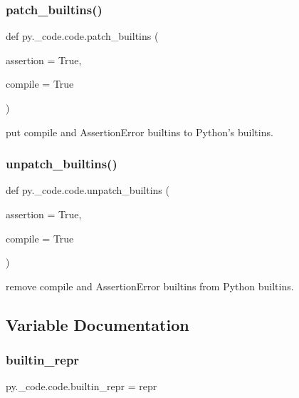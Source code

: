 \subsubsection{\texorpdfstring{patch\+\_\+builtins()}{patch\_builtins()}}
{\footnotesize\ttfamily def py.\+\_\+code.\+code.\+patch\+\_\+builtins (\begin{DoxyParamCaption}\item[{}]{assertion = {\ttfamily True},  }\item[{}]{compile = {\ttfamily True} }\end{DoxyParamCaption})}

\begin{DoxyVerb}put compile and AssertionError builtins to Python's builtins. \end{DoxyVerb}
 \mbox{\label{namespacepy_1_1__code_1_1code_adda6031c220f85d45eaaf9066e69157b}} 
\subsubsection{\texorpdfstring{unpatch\+\_\+builtins()}{unpatch\_builtins()}}
{\footnotesize\ttfamily def py.\+\_\+code.\+code.\+unpatch\+\_\+builtins (\begin{DoxyParamCaption}\item[{}]{assertion = {\ttfamily True},  }\item[{}]{compile = {\ttfamily True} }\end{DoxyParamCaption})}

\begin{DoxyVerb}remove compile and AssertionError builtins from Python builtins. \end{DoxyVerb}
 

\subsection{Variable Documentation}
\mbox{\label{namespacepy_1_1__code_1_1code_a8b110de86e73716ee564f8b84b462b30}} 
\subsubsection{\texorpdfstring{builtin\+\_\+repr}{builtin\_repr}}
{\footnotesize\ttfamily py.\+\_\+code.\+code.\+builtin\+\_\+repr = repr}

